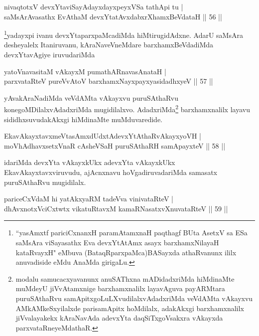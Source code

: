 \begin{shl}
nivaqtotxV devxYtaviSayAdayxdayxpeyxVSa tathA\s pi tu |\\
saMsArAvasathx EvAthaM devxYtatAvxdabxrXhamxBeVdataH \hfill || 56 ||
\end{shl}

\begin{artha}
\footnote{``yasAmxtf pariciCxnanxH paramAtamxnaH paqthagf BUta AsetxV sa ESa saMsAra viSayasathx Eva devxYtAtAmx asayx barxhamxNilayaH kataRvayxH" eMbuva (BataqRparxpaMca)BASayxda athaRvanunx ililx anuvadiside eMdu AnaMda girigaLu.}yadayxpi ivanu devxYtaparxpaMcadiMda hiMtirugidAdxne. AdarU saMsAra desheyalelx Itaniruvanu, kAraNaveVneMdare barxhamxBeVdadiMda devxYtavAgiye iruvudariMda
\end{artha}

\begin{shl}
yatoV\s navasitaM vAkayxM pumathARnavasAnataH |\\
parxvataRteV pureVvAtoV barxhamxNayxpayxyasidadhxyeV \hfill || 57 ||
\end{shl}

\begin{artha}
yAvakAraNadiMda veVdAMta vAkayxvu puruSAthaRvu konegoMDilalxvAdadxriMda mugidilalxvo. AdadxriMda\footnote{modalu samucacxyavanunx anuSAThxna mADidadxriMda hiMdinaMte muMdeyU jiVvAtamxnige barxhamxnalilx layavAguva payARMtara puruSAthaRvu samApitxgoLuLXvudilalxvAdadxriMda veVdAMta vAkayxvu AMkAMkeSxyilalxde parisamApitx hoMdilalx, adakAkxgi barxhamxnalilx jiVvalayakekx kAraNavAda adevxYta daqSiTxgoVsakxra vAkayxda parxvataRneyeMdathaR.} barxhamxnalilx layavu sididhxsuvudakAkxgi hiMdinaMte muMduvaredide.
\end{artha}

\begin{shl}
EkavAkayxtavxmeVtasAmxdUdxtAdevxYtAthaRvAkayxyoVH |\\
moVhAdhavxsetxVnaR cAsheVSaH puruSAthaRH samApayxteV \hfill || 58 ||
\end{shl}

\begin{artha}
idariMda devxYta vAkayxkUkx adevxYta vAkayxkUkx EkavAkayxtavxviruvudu, ajAcnxnavu hoVgadiruvadariMda samasatx puruSAthaRvu mugidilalx.
\end{artha}

\begin{shl}
\footnotemark{}pariceCxVdaM hi yatAkxyaRM tadeVva vinivataRteV |\\
dhAvxnotxVciCxtwtx vikatuRtavxM kamaRNasatxvXnuvataRteV \hfill || 59 ||
\end{shl}


